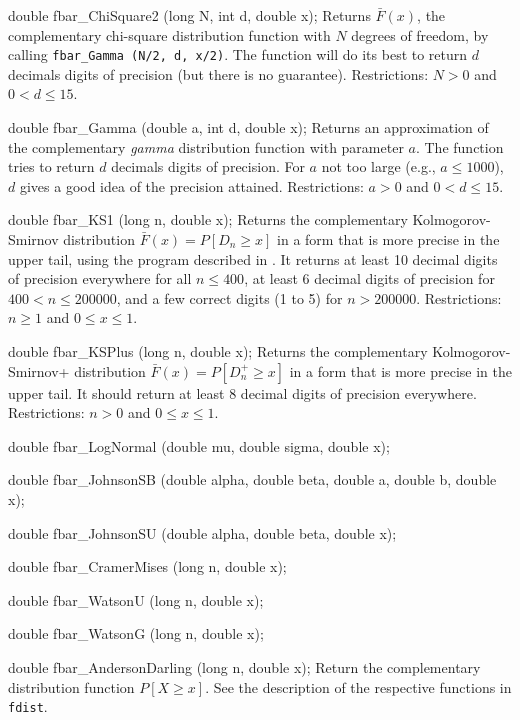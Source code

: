 double fbar_ChiSquare2 (long N, int d, double x);
\endcode
  \tab  Returns $\bar F(x)$, the complementary chi-square distribution
  function with $N$ degrees of freedom, by calling
  {\tt fbar\_Gamma (N/2, d, x/2)}.
  The function will do its best to return $d$ decimals
  digits of precision (but there is no guarantee).
  Restrictions:  $N>0$ and $0 < d \le 15$.
 \endtab
\code


double fbar_Gamma (double a, int d, double x);
\endcode
  \tab
  Returns an approximation \cite{tBAT70a} of the complementary {\em gamma\/}
  distribution function with parameter $a$.
  The function tries to return $d$ decimals digits of precision.
  For $a$ not too large (e.g., $a \le 1000$),
  $d$ gives a good idea of the precision attained.
   Restrictions:  $a>0$ and  $0 < d \le 15$.
  \endtab
\code


double fbar_KS1 (long n, double x);
\endcode
\tab Returns the complementary Kolmogorov-Smirnov distribution 
$\bar F(x) = P[D_n \ge x]$ in a form that is more precise in the upper tail,
using the program described in \cite{LECz09}. 
It returns at least 10 decimal digits of precision everywhere for all
 $n \le 400$,
 at least 6 decimal digits of precision for $400 < n \le 200000$,
and a few correct digits (1 to 5) for $n > 200000$.
 Restrictions:  $n\ge 1$ and $0 \le x \le 1$.
\endtab
\code


double fbar_KSPlus (long n, double x);
\endcode 
\tab Returns the complementary Kolmogorov-Smirnov+ distribution 
$\bar F(x) = P[D_n^+ \ge x]$ in a form that is more precise in the upper
tail. It should return at least 8 decimal digits of precision everywhere. 
 Restrictions:  $n>0$ and $0 \le x \le 1$.
\endtab
\code


double fbar_LogNormal (double mu, double sigma, double x);

double fbar_JohnsonSB (double alpha, double beta, double a, double b,
                       double x);

double fbar_JohnsonSU (double alpha, double beta, double x);

double fbar_CramerMises (long n, double x);

double fbar_WatsonU (long n, double x);

double fbar_WatsonG (long n, double x);

double fbar_AndersonDarling (long n, double x);
\endcode
  \tab  Return the complementary distribution function $P[X\ge x]$.
   See the description of the respective functions in \texttt{fdist}.
 \endtab


